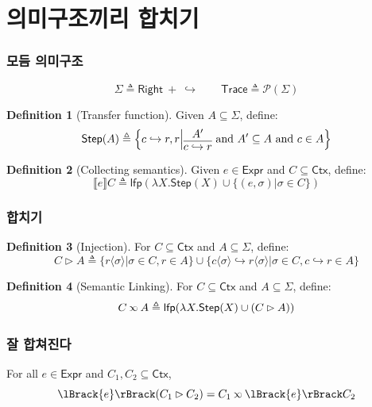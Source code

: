 \documentclass{beamer}
\theoremstyle{definition}
\newtheorem*{definition*}{Definition}
\newcommand*{\pset}{\mathcal{P}}
\newcommand*{\Expr}{\mathsf{Expr}}
\newcommand*{\ctx}{\sigma}
\newcommand*{\Ctx}{\mathsf{Ctx}}
\newcommand*{\Trace}{\mathsf{Trace}}
\newcommand*{\config}{c}
\newcommand*{\Right}{\mathsf{Right}}
\newcommand*{\rightst}{r}
\newcommand*{\lfp}{\mathsf{lfp}}
\newcommand*{\Step}{\mathsf{Step}}
\newcommand*{\semarrow}{\hookrightarrow}
\newcommand*{\semlink}{\mathbin{\rotatebox[origin=c]{180}{$\propto$}}}
\newcommand*{\sembracket}[1]{\lBrack{#1}\rBrack}
\newcommand*{\inject}[2]{{#2}\langle{#1}\rangle}
\begin{document}
\section{의미구조끼리 합치기}
\begin{frame}[c]
  \frametitle{모듬 의미구조}
  \[\Sigma\triangleq\Right\:+\:\semarrow\qquad\Trace\triangleq\pset(\Sigma)\]
  \begin{definition*}[Transfer function]
    Given $A\subseteq\Sigma$, define:
    \[
      \mathsf{Step}(A)\triangleq
      \left\{\config\semarrow\rightst, \rightst\middle|
      \begin{prooftree}[center=true]
        \hypo{A'}\infer1{\config\semarrow\rightst}
      \end{prooftree}\text{ and }
      A'\subseteq A\text{ and }\config\in A
      \right\}
    \]
  \end{definition*}
  \begin{definition*}[Collecting semantics]
    Given $e\in\Expr$ and $C\subseteq\Ctx$, define:
    \[
      \sembracket{e}C\triangleq\lfp(\lambda X.\mathsf{Step}(X)\cup\{(e,\ctx)|\ctx\in C\})
    \]
  \end{definition*}
\end{frame}
\begin{frame}[c]
  \frametitle{합치기}
  \begin{definition*}[Injection]
    For $C\subseteq\Ctx$ and $A\subseteq\Sigma$, define:
    \[C\rhd A\triangleq\{\inject{\ctx}{\rightst}|\ctx\in C,\rightst\in A\}\cup\{\inject{\ctx}{\config}\semarrow\inject{\ctx}{\rightst}|\ctx\in C,\config\semarrow\rightst\in A\}\]
  \end{definition*}
  \begin{definition*}[Semantic Linking]
    For $C\subseteq\Ctx$ and $A\subseteq \Sigma$, define:
    \[C\semlink A\triangleq\lfp(\lambda X.\Step(X)\cup(C\rhd A))\]
  \end{definition*}
\end{frame}
\begin{frame}[c]
  \frametitle{잘 합쳐진다}
  \begin{theorem}[Advance]
    For all $e\in\Expr$ and $C_1,C_2\subseteq\Ctx$,
    \[\sembracket{e}(C_1\rhd C_2)=C_1\semlink\sembracket{e}C_2\]
  \end{theorem}
\end{frame}
\end{document}
